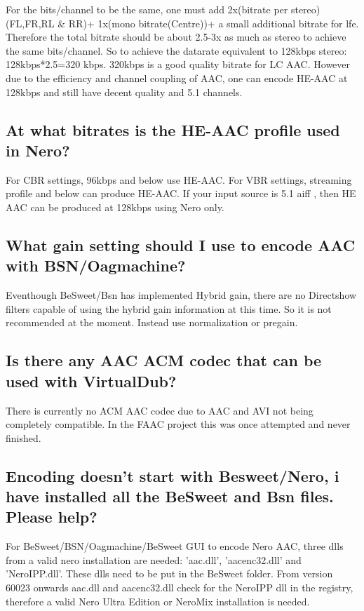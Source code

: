 ﻿\documentclass[12pt]{article}
\begin{document}
For the bits/channel to be the same, one must add 2x(bitrate per stereo)(FL,FR,RL \& RR)+ 1x(mono
bitrate(Centre))+ a small additional bitrate for lfe. Therefore the total bitrate should be about
2.5-3x as much as stereo to achieve the same bits/channel. So to achieve the datarate equivalent to
128kbps stereo: 128kbps*2.5=320 kbps. 320kbps is a good quality bitrate for LC AAC. However due to
the efficiency and channel coupling of AAC, one can encode HE-AAC at 128kbps and still have decent
quality and 5.1 channels.

\subsection{At what bitrates is the HE-AAC profile used in Nero?}

For CBR settings, 96kbps and below use HE-AAC. For VBR settings, streaming profile and below can
produce HE-AAC. If your input source is 5.1 aiff , then HE AAC can be produced at 128kbps using Nero
only.

\subsection{What gain setting should I use to encode AAC with BSN/Oagmachine?}

Eventhough BeSweet/Bsn has implemented Hybrid gain, there are no Directshow filters capable of using
the hybrid gain information at this time. So it is not recommended at the moment. Instead use
normalization or pregain.

\subsection{Is there any AAC ACM codec that can be used with VirtualDub?}

There is currently no ACM AAC codec due to AAC and AVI not being completely compatible. In the FAAC project this was once attempted and never finished.

\subsection{Encoding doesn't start with Besweet/Nero, i have installed all the BeSweet and Bsn files. Please help?}

For BeSweet/BSN/Oagmachine/BeSweet GUI to encode Nero AAC, three dlls from a valid nero installation
are needed: 'aac.dll', 'aacenc32.dll' and 'NeroIPP.dll'. These dlls need to be put in the BeSweet
folder. From version 60023 onwards aac.dll and aacenc32.dll check for the NeroIPP dll in the
registry, therefore a valid Nero Ultra Edition or NeroMix installation is needed.
\end{document}
